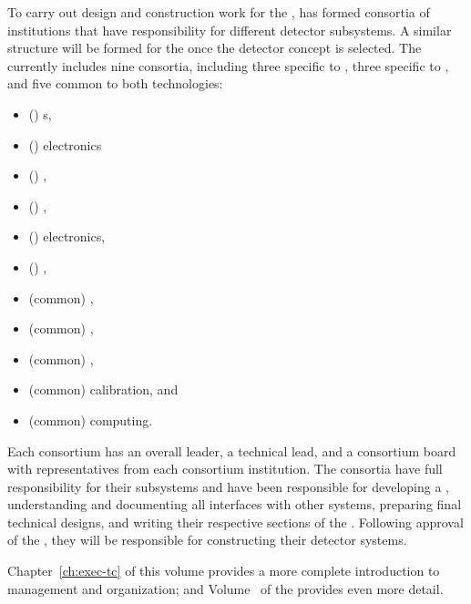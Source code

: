 To carry out design and construction work for the  ,  has  formed consortia of institutions that have responsibility for different detector subsystems. A similar structure will be formed for the   once the detector concept is selected. The   currently includes nine consortia, including three specific to , three specific to , and five common to both technologies:
\begin{itemize}
\item (\single) s, %
\item (\single)  electronics %
\item (\single) , %
\item (\dual) , %
\item (\dual)  electronics, %
\item (\dual) , %
\item (common) , %
\item (common) ,  %
\item (common) , %
\item (common) calibration,  and %
\item (common) computing.
\end{itemize} 
 Each consortium has an overall leader, a technical lead, and a consortium board with representatives from each consortium institution. The consortia have full responsibility for their subsystems and have been responsible for developing a , understanding and documenting all interfaces with other systems, preparing final technical designs, and writing their respective sections of the . Following approval of the  , they will be responsible for constructing their detector systems. %

Chapter~\ref{ch:exec-tc} of this volume provides a more complete introduction to  management and organization; and Volume~\volnumbertc{} of the  provides even more detail.

